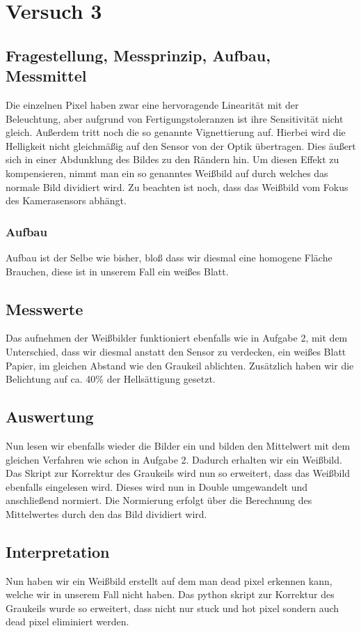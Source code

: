 \documentclass[TGAI_Laborbericht.tex]{subfiles}
\begin{document}
\chapter{Versuch 3}
\label{chap:VERSUCH_3}

\section{Fragestellung, Messprinzip, Aufbau, Messmittel}
\label{chap:VERSUCH_3_FRAGESTELLUNG}
Die einzelnen Pixel haben zwar eine hervoragende Linearität mit der Beleuchtung, aber aufgrund von Fertigungstoleranzen ist ihre Sensitivität nicht gleich. Außerdem tritt noch die so genannte Vignettierung auf. Hierbei wird die Helligkeit nicht gleichmäßig auf den Sensor von der Optik übertragen. Dies äußert sich in einer Abdunklung des Bildes zu den Rändern hin. Um diesen Effekt zu kompensieren, nimmt man ein so genanntes Weißbild auf durch welches das normale Bild dividiert wird. Zu beachten ist noch, dass das Weißbild vom Fokus des Kamerasensors abhängt.

\subsection{Aufbau}

Aufbau ist der Selbe wie bisher, bloß dass wir diesmal eine homogene Fläche Brauchen, diese ist in unserem Fall ein weißes Blatt.

\section{Messwerte}
\label{chap:VERSUCH_3_MESSWERTE}

Das aufnehmen der Weißbilder funktioniert ebenfalls wie in Aufgabe 2, mit dem Unterschied, dass wir diesmal anstatt den Sensor zu verdecken, ein weißes Blatt Papier, im gleichen Abstand wie den Graukeil ablichten. Zusätzlich haben wir die Belichtung auf ca. 40\% der Hellsättigung gesetzt.

\section{Auswertung}
\label{chap:VERSUCH_3_AUSWERTUNG}

Nun lesen wir ebenfalls wieder die Bilder ein und bilden den Mittelwert mit dem gleichen Verfahren wie schon in Aufgabe 2. Dadurch erhalten wir ein Weißbild. Das Skript zur Korrektur des Graukeils wird nun so erweitert, dass das Weißbild ebenfalls eingelesen wird. Dieses wird nun in Double umgewandelt und anschließend normiert. Die Normierung erfolgt über die Berechnung des Mittelwertes durch den das Bild dividiert wird.

\section{Interpretation}
\label{chap:VERSUCH_3_INTERPRETATION}

Nun haben wir ein Weißbild erstellt auf dem man dead pixel erkennen kann, welche wir in unserem Fall nicht haben. Das python skript  zur Korrektur des Graukeils wurde so erweitert, dass nicht nur stuck und hot pixel sondern auch dead pixel eliminiert werden.
\end{document}
